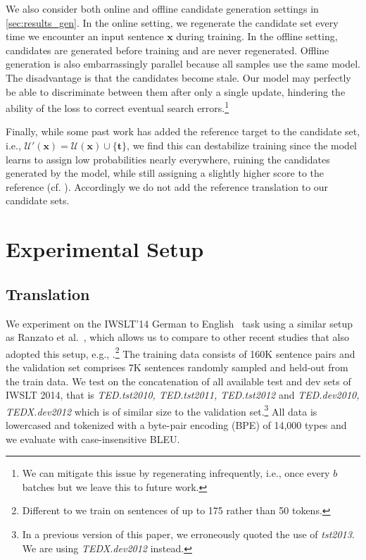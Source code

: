 \documentclass[11pt,a4paper]{article}
\newcommand{\source}{\mathbf{x}}
\newcommand{\goldreference}{\mathbf{t}}
\newcommand{\candhypos}{\mathcal{U}}
\begin{document}
We also consider both online and offline candidate generation settings in \textsection\ref{sec:results_gen}.
In the online setting, we regenerate the candidate set every time we encounter an input sentence $\source$ during training.
In the offline setting, candidates are generated before training and are never regenerated. Offline generation is also embarrassingly parallel because all samples use the same model.
The disadvantage is that the candidates become stale.
Our model may perfectly be able to discriminate between them after only a single update, hindering the ability of the loss to correct eventual search errors.\footnote{We can mitigate this issue by regenerating infrequently, i.e., once every $b$ batches but we leave this to future work.}

Finally, while some past work has added the reference target to the candidate set, i.e., $\candhypos{}'(\source) = \candhypos(\source) \cup \{ \goldreference \}$, we find this can destabilize training since the model learns to assign low probabilities nearly everywhere, ruining the candidates generated by the model, while still assigning a slightly higher score to the reference (cf. \citet{shen2016mrt}).
Accordingly we do not add the reference translation to our candidate sets.

\section{Experimental Setup}
\label{sec:expsetup}

\subsection{Translation}
\label{sec:expsetup_translation}
We experiment on the IWSLT'14 German to English~\citep{cettolo2014report} task using a similar setup as Ranzato et al.~, which allows us to compare to other recent studies that also adopted this setup, e.g., \citet{wiseman2016acl}.\footnote{Different to \citet{ranzato2015sequence} we train on sentences of up to 175 rather than 50 tokens.}
The training data consists of 160K sentence pairs and the validation set comprises 7K sentences randomly sampled and held-out from the train data.
We test on the concatenation of all available test and dev sets of IWSLT 2014, that is \textit{TED.tst2010, TED.tst2011, TED.tst2012} and \textit{TED.dev2010, TEDX.dev2012} which is of similar size to the validation set.\footnote{In a previous version of this paper, we erroneously quoted the use of \textit{tst2013}. We are using \emph{TEDX.dev2012} instead.}
All data is lowercased and tokenized with a byte-pair encoding (BPE) of 14,000 types \citep{sennrich2016bpe} and we evaluate with case-insensitive BLEU.
\end{document}
